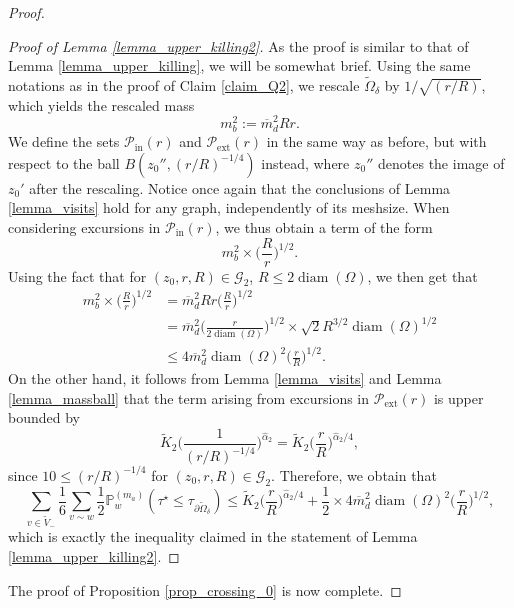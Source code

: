 \documentclass{article}
\newcommand{\PP}{{\mathbb{P}}}
\theoremstyle{definition}
\theoremstyle{remark}
\theoremstyle{remark}
\begin{document}
\begin{proof}
\begin{proof}[Proof of Lemma \ref{lemma_upper_killing2}]
As the proof is similar to that of Lemma \ref{lemma_upper_killing}, we will be somewhat brief. Using the same notations as in the proof of Claim \ref{claim_Q2}, we rescale $\tilde \Omega_{\delta}$ by $1/\sqrt{(r/R)}$, which yields the rescaled mass
\begin{equation*}
    m_{b}^{2} := \overline{m}_d^2Rr.
\end{equation*}
We define the sets $\mathcal{P}_{\text{in}}(r)$ and $\mathcal{P}_{\text{ext}}(r)$ in the same way as before, but with respect to the ball $B(z_0'', (r/R)^{-1/4})$ instead, where $z_0''$ denotes the image of $z_0'$ after the rescaling. Notice once again that the conclusions of Lemma \ref{lemma_visits} hold for any graph, independently of its meshsize. When considering excursions in $\mathcal{P}_{\text{in}}(r)$, we thus obtain a term of the form
\begin{equation*}
    m_{b}^{2} \times \bigg(\frac{R}{r}\bigg)^{1/2}.
\end{equation*}
Using the fact that for $(z_0,r,R) \in \mathcal{G}_{2}$, $R \leq 2\operatorname{diam}(\Omega)$, we then get that
\begin{align*}
    m_{b}^{2} \times \bigg(\frac{R}{r}\bigg)^{1/2} &= \overline{m}_{d}^2Rr\bigg(\frac{R}{r}\bigg)^{1/2} \\
    &= \overline{m}_d^2\bigg(\frac{r}{2\operatorname{diam}(\Omega)}\bigg)^{1/2} \times \sqrt{2}R^{3/2}\operatorname{diam}(\Omega)^{1/2} \\
    &\leq 4\overline{m}_d^2\operatorname{diam}(\Omega)^{2} \bigg( \frac{r}{R}\bigg)^{1/2}.
\end{align*}
On the other hand, it follows from Lemma \ref{lemma_visits} and Lemma \ref{lemma_massball} that the term arising from excursions in $\mathcal{P}_{\text{ext}}(r)$ is upper bounded by
\begin{equation*}
    \tilde K_2 \bigg( \frac{1}{(r/R)^{-1/4}} \bigg)^{\hat \alpha_2} = \tilde K_2 \bigg( \frac{r}{R} \bigg)^{\hat \alpha_2/4},
\end{equation*}
since $10 \leq  (r/R)^{-1/4}$ for $(z_0,r,R) \in \mathcal{G}_2$. Therefore, we obtain that
\begin{equation*}
     \sum_{v \in \tilde V_{-}} \frac{1}{6} \sum_{v \sim w} \frac{1}{2}\PP_{w}^{({m}_a)}(\tau^{\star} \leq \tau_{\partial \tilde \Omega_{\delta}}) \leq \tilde K_2 \bigg( \frac{r}{R}\bigg)^{\hat \alpha_2 /4} + \frac{1}{2} \times 4\overline{m}_d^2\operatorname{diam}(\Omega)^{2} \bigg( \frac{r}{R}\bigg)^{1/2},
\end{equation*}
which is exactly the inequality claimed in the statement of Lemma \ref{lemma_upper_killing2}.
\end{proof}

The proof of Proposition \ref{prop_crossing_0} is now complete.
\end{proof}
\end{document}
